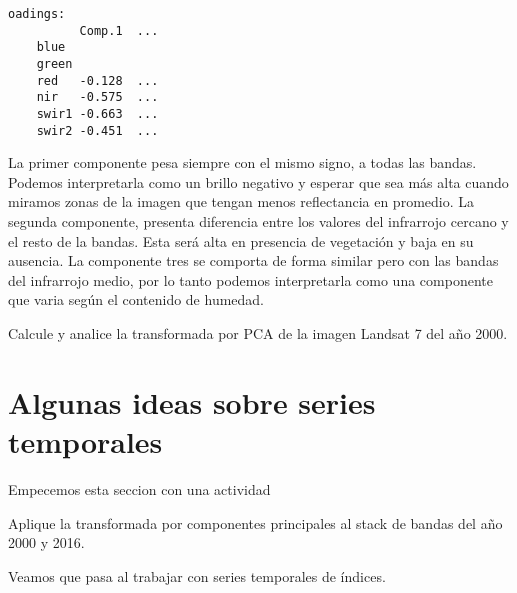 \begin{exa}
    \begin{Verbatim}[fontsize=\small]
    oadings:
          Comp.1  ...
    blue
    green
    red   -0.128  ...
    nir   -0.575  ...
    swir1 -0.663  ...
    swir2 -0.451  ...
    \end{Verbatim}

    La primer componente pesa siempre con el mismo signo, a
    todas las bandas. Podemos interpretarla como un
    brillo negativo y esperar que sea m\'as alta cuando miramos zonas de la imagen que
    tengan menos reflectancia en promedio. La segunda componente, presenta diferencia
    entre los valores del infrarrojo cercano y el resto de la bandas. Esta ser\'a alta
    en presencia de vegetaci\'on y baja en su ausencia. La componente tres se comporta
    de forma similar pero con las bandas del infrarrojo medio, por lo tanto podemos
    interpretarla como una componente que varia seg\'un el contenido de humedad.
\end{exa}

\begin{act}
    Calcule y analice la transformada por PCA de la imagen Landsat 7 del año
    2000.
\end{act}

\section{Algunas ideas sobre series temporales}

Empecemos esta seccion con una actividad

\begin{act}
    Aplique la transformada por componentes principales al stack de bandas del
    año 2000 y 2016.
\end{act}

Veamos que pasa al trabajar con series temporales de \'indices.

